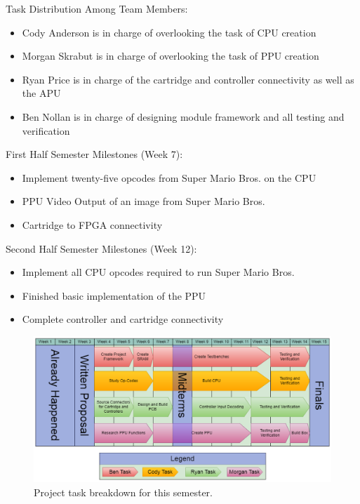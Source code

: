 \documentclass[a4paper]{article}
\begin{document}
Task Distribution Among Team Members:
\begin{itemize}
\item Cody Anderson is in charge of overlooking the task of CPU creation \\
\item Morgan Skrabut is in charge of overlooking the task of PPU creation \\
\item Ryan Price is in charge of the cartridge and controller connectivity as well as the APU \\
\item Ben Nollan is in charge of designing module framework and all testing and verification
\end{itemize}
First Half Semester Milestones (Week 7):
\begin{itemize}
\item Implement twenty-five opcodes from Super Mario Bros. on the CPU \\
\item PPU Video Output of an image from Super Mario Bros. \\
\item Cartridge to FPGA connectivity \\
\end{itemize}
Second Half Semester Milestones (Week 12):
\begin{itemize}
\item Implement all CPU opcodes required to run Super Mario Bros. \\
\item Finished basic implementation of the PPU \\
\item Complete controller and cartridge connectivity \\
\end{itemize}
\begin{figure}[H]
\centering
\includegraphics[width=\textwidth]{Schedule.PNG}
\caption{\label{fig:Schedule}Project task breakdown for this semester.}
\end{figure}
\end{document}
